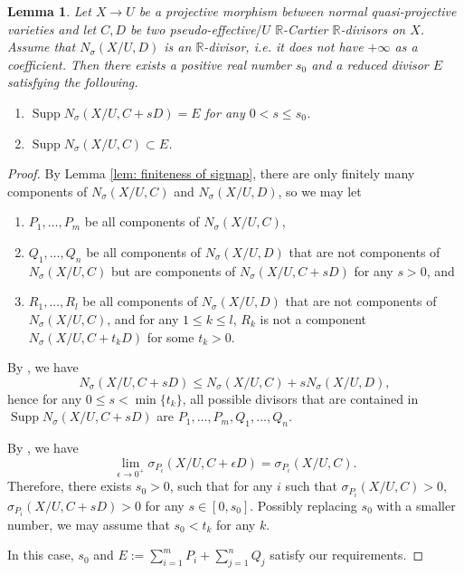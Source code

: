 \documentclass[12pt]{amsart}
\numberwithin{equation}{section}
\newcommand{\Rr}{\mathbb{R}}
\newcommand{\Supp}{\operatorname{Supp}}
\newtheorem{lem}[thm]{Lemma}
\theoremstyle{definition}
\theoremstyle{definition}
\theoremstyle{definition}
\begin{document}
\begin{lem}\label{lem: limit of nakayama-zariski decomposition}
    Let $X\rightarrow U$ be a projective morphism between normal quasi-projective varieties and let $C,D$ be two pseudo-effective$/U$ $\Rr$-Cartier $\Rr$-divisors on $X$. Assume that $N_{\sigma}(X/U,D)$ is an $\Rr$-divisor, i.e. it does not have $+\infty$ as a coefficient. Then there exists a positive real number $s_0$ and a reduced divisor $E$ satisfying the following.
    \begin{enumerate}
        \item $\Supp N_{\sigma}(X/U,C+sD)=E$ for any $0<s\leq s_0$.
        \item $\Supp N_{\sigma}(X/U,C)\subset E$.
    \end{enumerate}
\end{lem}
\begin{proof}
By Lemma \ref{lem: finiteness of sigmap}, there are only finitely many components of $N_{\sigma}(X/U,C)$ and $N_{\sigma}(X/U,D)$, so we may let
\begin{enumerate}
    \item $P_1,\dots,P_m$ be all components of $N_{\sigma}(X/U,C)$,
    \item  $Q_1,\dots,Q_n$ be all components of $N_{\sigma}(X/U,D)$ that are not components of $N_{\sigma}(X/U,C)$ but are components of $N_{\sigma}(X/U,C+sD)$ for any $s>0$, and
    \item $R_1,\dots,R_l$ be all components of $N_{\sigma}(X/U,D)$ that are not components of $N_{\sigma}(X/U,C)$, and for any $1\leq k\leq l$, $R_k$ is not a component $N_{\sigma}(X/U,C+t_kD)$ for some $t_k>0$.
\end{enumerate}
By \cite[Lemma 3.3(2)]{LX23}, we have
$$N_{\sigma}(X/U,C+sD)\leq N_{\sigma}(X/U,C)+sN_{\sigma}(X/U,D),$$
hence for any $0\leq s<\min\{t_k\}$, all possible divisors that are contained in $\Supp N_{\sigma}(X/U,C+sD)$ are $P_1,\dots,P_m,Q_1,\dots,Q_n$.

By \cite[Lemma 3.3(3)]{LX23}, we have
$$\lim_{\epsilon\rightarrow 0^+}\sigma_{P_i}(X/U,C+\epsilon D)=\sigma_{P_i}(X/U,C).$$
Therefore, there exists $s_0>0$,  such that for any $i$ such that $\sigma_{P_i}(X/U,C)>0$, $\sigma_{P_i}(X/U,C+sD)>0$ for any $s\in [0,s_0]$. Possibly replacing $s_0$ with a smaller number, we may assume that $s_0<t_k$ for any $k$. 

In this case, $s_0$ and $E:=\sum_{i=1}^m P_i+\sum_{j=1}^n Q_j$ satisfy our requirements.
\end{proof}
\end{document}
